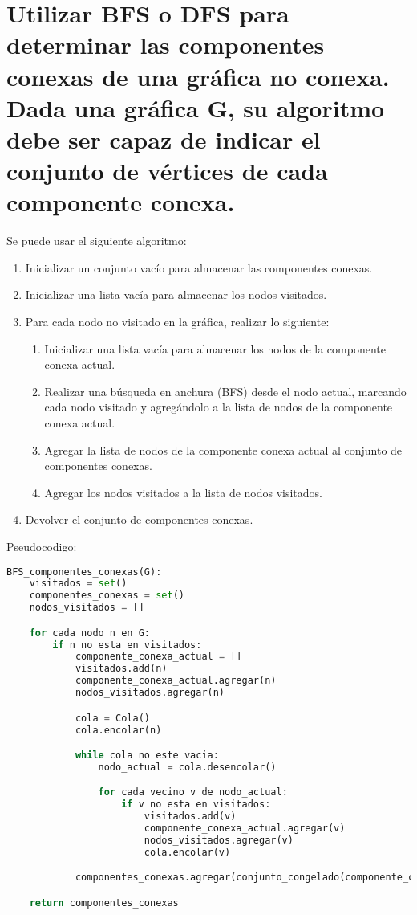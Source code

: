 
\section{Utilizar BFS o DFS para determinar las componentes conexas de una gráfica
no conexa. Dada una gráfica G, su algoritmo debe ser capaz de indicar el
conjunto de vértices de cada componente conexa.}

Se puede usar el siguiente algoritmo:

\begin{enumerate}
  \item Inicializar un conjunto vacío para almacenar las componentes conexas.
  \item Inicializar una lista vacía para almacenar los nodos visitados.
  \item Para cada nodo no visitado en la gráfica, realizar lo siguiente:
  \begin{enumerate}
    \item  Inicializar una lista vacía para almacenar los nodos de la componente conexa actual.
    \item  Realizar una búsqueda en anchura (BFS) desde el nodo actual,
    marcando cada nodo visitado y agregándolo a la lista de nodos de la componente conexa actual.
    \item Agregar la lista de nodos de la componente conexa actual al conjunto de componentes conexas.
    \item Agregar los nodos visitados a la lista de nodos visitados.
  \end{enumerate}
  \item Devolver el conjunto de componentes conexas. 
\end{enumerate}

\newpage

Pseudocodigo:

\begin{lstlisting}[language=python]
  BFS_componentes_conexas(G):
    visitados = set()
    componentes_conexas = set()
    nodos_visitados = []

    for cada nodo n en G:
        if n no esta en visitados:
            componente_conexa_actual = []
            visitados.add(n)
            componente_conexa_actual.agregar(n)
            nodos_visitados.agregar(n)

            cola = Cola()
            cola.encolar(n)

            while cola no este vacia:
                nodo_actual = cola.desencolar()

                for cada vecino v de nodo_actual:
                    if v no esta en visitados:
                        visitados.add(v)
                        componente_conexa_actual.agregar(v)
                        nodos_visitados.agregar(v)
                        cola.encolar(v)

            componentes_conexas.agregar(conjunto_congelado(componente_conexa_actual))

    return componentes_conexas
\end{lstlisting}

